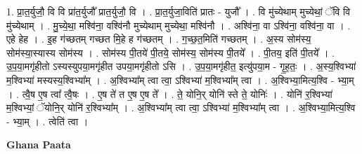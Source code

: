 \documentclass[17pt]{extarticle}
\begin{document}
1. प्रा॒त॒र्युजौ॒ वि वि प्रा॑त॒र्युजौ᳚ प्रात॒र्युजौ॒ वि । . प्रा॒त॒र्युजा॒विति॑ प्रातः - युजौ᳚ । . वि मु॑च्येथाम् मुच्येथां॒ ॅवि वि मु॑च्येथाम् । . मु॒च्ये॒था॒ मश्वि॑ना॒ वश्वि॑नौ मुच्येथाम् मुच्येथा॒ मश्वि॑नौ । . अश्वि॑ना॒ वा ऽश्वि॑ना॒ वश्वि॑ना॒ वा । . एहे हेह । . इ॒ह ग॑च्छतम् गच्छत मि॒हे ह ग॑च्छतम् । . ग॒च्छ॒त॒मिति॑ गच्छतम् । . अ॒स्य सोम॑स्य॒ सोम॑स्या॒स्यास्य सोम॑स्य । . सोम॑स्य पी॒तये॑ पी॒तये॒ सोम॑स्य॒ सोम॑स्य पी॒तये᳚ । . पी॒तय॒ इति॑ पी॒तये᳚ । . उ॒प॒या॒मगृ॑हीतो ऽस्यस्युपया॒मगृ॑हीत उपया॒मगृ॑हीतो ऽसि । . उ॒प॒या॒मगृ॑हीत॒ इत्यु॑पया॒म - गृ॒ह॒तः॒ । . अ॒स्य॒श्विभ्या॑ म॒श्विभ्या॑ मस्यस्य॒श्विभ्या᳚म् । . अ॒श्विभ्या᳚म् त्वा त्वा॒ ऽश्विभ्या॑ म॒श्विभ्या᳚म् त्वा । . अ॒श्विभ्या॒मित्य॒श्वि - भ्या॒म् । . त्वै॒ष ए॒ष त्वा᳚ त्वै॒षः । . ए॒ष ते॑ त ए॒ष ए॒ष ते᳚ । . ते॒ योनि॒र् योनि॑ स्ते ते॒ योनिः॑ । . योनि॑ र॒श्विभ्या॑ म॒श्विभ्यां॒ ॅयोनि॒र् योनि॑ र॒श्विभ्या᳚म् । . अ॒श्विभ्या᳚म् त्वा त्वा॒ ऽश्विभ्या॑ म॒श्विभ्या᳚म् त्वा । . अ॒श्विभ्या॒मित्य॒श्वि - भ्या॒म् । . त्वेति॑ त्वा । \newline

\textbf{Ghana Paata } \newline
\end{document}
